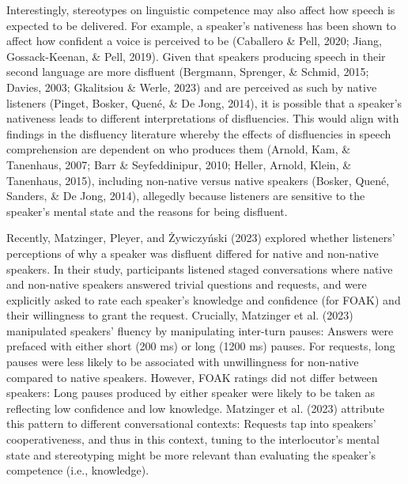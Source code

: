 \documentclass[
  man,floatsintext]{apa7}
\begin{document}
Interestingly, stereotypes on linguistic competence may also affect how speech is expected to be delivered. For example, a speaker's nativeness has been shown to affect how confident a voice is perceived to be (Caballero \& Pell, 2020; Jiang, Gossack-Keenan, \& Pell, 2019). Given that speakers producing speech in their second language are more disfluent (Bergmann, Sprenger, \& Schmid, 2015; Davies, 2003; Gkalitsiou \& Werle, 2023) and are perceived as such by native listeners (Pinget, Bosker, Quené, \& De Jong, 2014), it is possible that a speaker's nativeness leads to different interpretations of disfluencies. This would align with findings in the disfluency literature whereby the effects of disfluencies in speech comprehension are dependent on who produces them (Arnold, Kam, \& Tanenhaus, 2007; Barr \& Seyfeddinipur, 2010; Heller, Arnold, Klein, \& Tanenhaus, 2015), including non-native versus native speakers (Bosker, Quené, Sanders, \& De Jong, 2014), allegedly because listeners are sensitive to the speaker's mental state and the reasons for being disfluent.

Recently, Matzinger, Pleyer, and Żywiczyński (2023) explored whether listeners' perceptions of why a speaker was disfluent differed for native and non-native speakers. In their study, participants listened staged conversations where native and non-native speakers answered trivial questions and requests, and were explicitly asked to rate each speaker's knowledge and confidence (for FOAK) and their willingness to grant the request. Crucially, Matzinger et al. (2023) manipulated speakers' fluency by manipulating inter-turn pauses: Answers were prefaced with either short (200 ms) or long (1200 ms) pauses. For requests, long pauses were less likely to be associated with unwillingness for non-native compared to native speakers. However, FOAK ratings did not differ between speakers: Long pauses produced by either speaker were likely to be taken as reflecting low confidence and low knowledge. Matzinger et al. (2023) attribute this pattern to different conversational contexts: Requests tap into speakers' cooperativeness, and thus in this context, tuning to the interlocutor's mental state and stereotyping might be more relevant than evaluating the speaker's competence (i.e., knowledge).
\end{document}
